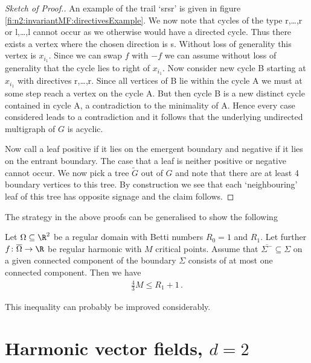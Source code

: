 \begin{proof}[Sketch of Proof.]
  An example of the trail `srsr' is given in figure \ref{fi:n2:invariantMF:directivesExample}.
  We now note that cycles of the type r,\dots,r or l,\dots,l
  cannot occur as we otherwise would have a directed cycle. Thus there exists a vertex where the chosen direction is s. 
  Without loss of generality this vertex is $x_{i_1}$.
  Since we can swap $f$ with $-f$ we can assume without loss of generality that the cycle lies to right of $x_{i_1}$.
  Now consider new cycle B starting at $x_{i_1}$ with directives r,\dots,r.
  Since all vertices of B lie within the cycle A we must at some step reach a vertex on the cycle A. But then cycle B is a new distinct cycle
  contained in cycle A, a contradiction to the minimality of A.
  Hence every case considered leads to a contradiction and it follows that the underlying undirected multigraph of $G$
  is acyclic.
  
  Now call a leaf positive if it lies on the emergent boundary and
  negative if it lies on the entrant boundary. The case that a leaf is neither positive or negative cannot occur.
  We now pick a tree $\widetilde{G}$ out of $G$ and note that
  there are at least 4 boundary vertices to this tree.
  By construction we see that each `neighbouring' leaf of this tree
  has opposite signage and the claim follows.
\end{proof} 

The strategy in the above proofs can be generalised to show the following
\begin{conjecture}
  Let $\Omega\subseteq\R^2$ be a regular domain with Betti numbers $R_0=1$ and $R_1$.
  Let further $f\colon\overline{\Omega}\to\R$ be regular harmonic with $M$ critical points.
  Assume that 
  $\overline{\Sigma^-}\subseteq\Sigma$ on a given connected component 
  of the boundary $\Sigma$
  consists of at most one connected component. Then we have
  \begin{align*}
    \frac{4}{3}M\leq R_1+1\,.
  \end{align*}
\end{conjecture}
This inequality can probably be improved considerably.

\newpage

\section{Harmonic vector fields, $d=2$}

